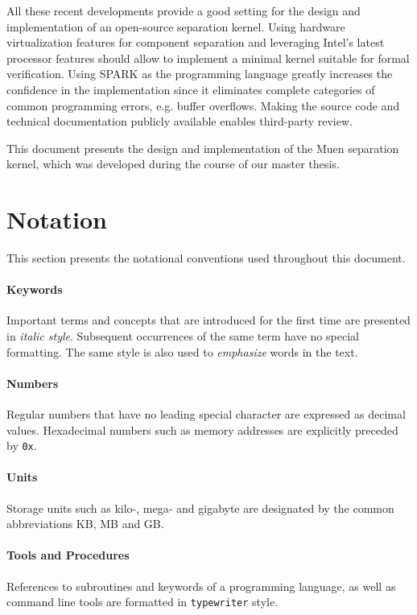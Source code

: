 All these recent developments provide a good setting for the design and
implementation of an open-source separation kernel. Using hardware
virtualization features for component separation and leveraging Intel's latest
processor features should allow to implement a minimal kernel suitable for
formal verification. Using SPARK as the programming language greatly increases
the confidence in the implementation since it eliminates complete categories of
common programming errors, e.g. buffer overflows. Making the source code and
technical documentation publicly available enables third-party review.

This document presents the design and implementation of the Muen separation
kernel, which was developed during the course of our master thesis.

\section{Notation}
This section presents the notational conventions used throughout this document.

\paragraph{Keywords}
Important terms and concepts that are introduced for the first time are
presented in \emph{italic style}. Subsequent occurrences of the same term have
no special formatting. The same style is also used to \emph{emphasize} words in
the text.

\paragraph{Numbers}
Regular numbers that have no leading special character are expressed as decimal
values. Hexadecimal numbers such as memory addresses are explicitly preceded by
\texttt{0x}.

\paragraph{Units}
Storage units such as kilo-, mega- and gigabyte are designated by
the common abbreviations KB, MB and GB.

\paragraph{Tools and Procedures}
References to subroutines and keywords of a programming language, as well as
command line tools are formatted in \texttt{typewriter} style.

